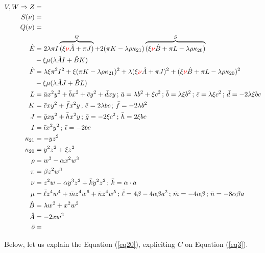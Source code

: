 \begin{align}
V,W\Rightarrow Z&=\\
S(\nu)&=\\
Q(\nu)&=\\
\hat E &= 2\lambda \pi I\overbrace{(\xi {\color{red}\nu} \hat A + \pi J)}^{Q} + 2(\pi K - \lambda \rho \kappa_{21})\overbrace{(\xi {\color{red}\nu} \hat B + \pi L - \lambda \rho \kappa_{20})}^{S}  \\
&- \xi \mu (\lambda \hat AI  + \hat BK  )\\
\hat F &= \lambda\xi \pi^2 I^2 +\xi (\pi K - \lambda \rho \kappa_{21})^2 + \lambda (\xi {\color{red}\nu} \hat A + \pi J)^2 + (\xi {\color{red}\nu} \hat B + \pi L - \lambda \rho \kappa_{20})^2 \\
&- \xi \mu (\lambda \hat A J + \hat B L) \\
L &= \bar a x^2 y^2 + \bar b x^2 + \bar c y^2 + \bar d xy \,;\,\bar a = \lambda b^2 + \xi c^2\,;\,\bar b = \lambda \xi b^2\,;\,\bar c = \lambda \xi c^2\,;\,\bar d = -2 \lambda \xi bc \\
K &= \bar e xy^2 + \bar f x^2 y \,;\,\bar e = 2 \lambda bc \,;\,\bar f = -2\lambda b^2 \\
J &= \bar g xy^2 + \bar h x^2 y \,;\,\bar g = -2\xi c^2 \,;\,\bar h = 2\xi bc \\
I &= \bar \iota x^2 y^2 \,;\, \bar \iota = -2bc \\
\kappa_{21} &= -yz^2 \\
\kappa_{20} &= y^2 z^2 + \xi z^2\\
\rho &= w^3 - \alpha x^2 w^3\\
\pi &= \beta z^2w^3\\
\nu &= z^2 w - \alpha y^3 z^2 + \bar k y^2 z^2\,;\,\bar k = \alpha \cdot a\\
\mu &= \bar \ell z^4 w^4 + \bar m z^4 w^6 + \bar n z^4 w^5 \,;\,\bar \ell = 4\beta   -4\alpha\beta a^2 \,;\,\bar m = -4\alpha\beta \,;\,\bar n = - 8\alpha\beta a \\
\hat B &= \lambda w^2 + x^2 w^2\\
\hat A &= -2xw^2 \\
\bar o &=
\end{align}

\newpage

Below, let us explain the Equation (\ref{eq20}), expliciting $C$ on Equation (\ref{eq3}).

